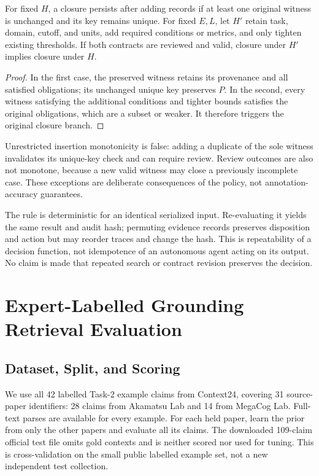 \documentclass[runningheads]{llncs}
\begin{document}
\begin{proposition}
For fixed $H$, a closure persists after adding records if at least one original witness is unchanged and its key remains unique. For fixed $E,L$, let $H'$ retain task, domain, cutoff, and units, add required conditions or metrics, and only tighten existing thresholds. If both contracts are reviewed and valid, closure under $H'$ implies closure under $H$.
\end{proposition}
\begin{proof}
In the first case, the preserved witness retains its provenance and all satisfied obligations; its unchanged unique key preserves $P$. In the second, every witness satisfying the additional conditions and tighter bounds satisfies the original obligations, which are a subset or weaker. It therefore triggers the original closure branch.
\end{proof}
Unrestricted insertion monotonicity is false: adding a duplicate of the sole witness invalidates its unique-key check and can require review. Review outcomes are also not monotone, because a new valid witness may close a previously incomplete case. These exceptions are deliberate consequences of the policy, not annotation-accuracy guarantees.

The rule is deterministic for an identical serialized input. Re-evaluating it yields the same result and audit hash; permuting evidence records preserves disposition and action but may reorder traces and change the hash. This is repeatability of a decision function, not idempotence of an autonomous agent acting on its output. No claim is made that repeated search or contract revision preserves the decision.

\section{Expert-Labelled Grounding Retrieval Evaluation}
\subsection{Dataset, Split, and Scoring}
We use all 42 labelled Task-2 example claims from Context24, covering 31 source-paper identifiers: 28 claims from Akamatsu Lab and 14 from MegaCog Lab. Full-text parses are available for every example. For each held paper, learn the prior from only the other papers and evaluate all its claims. The downloaded 109-claim official test file omits gold contexts and is neither scored nor used for tuning. This is cross-validation on the small public labelled example set, not a new independent test collection.
\end{document}
